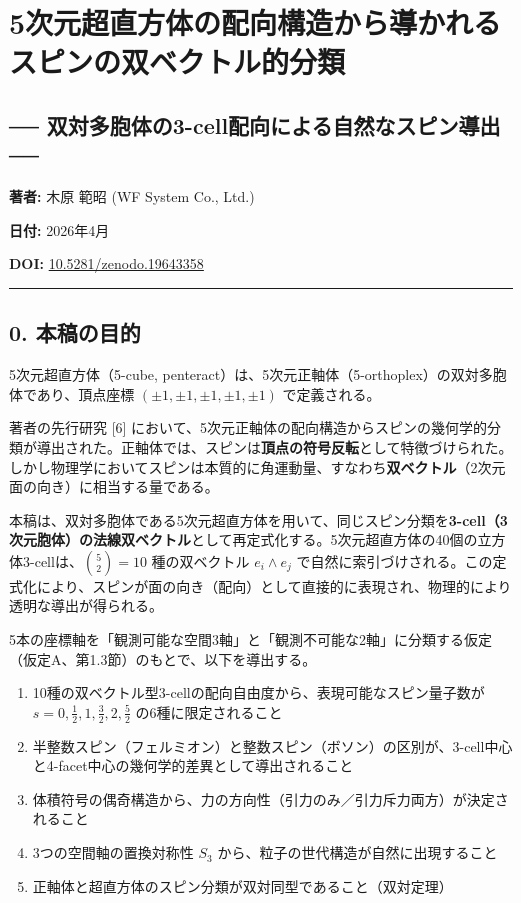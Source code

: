 \documentclass[a4paper,11pt]{ltjsarticle}
\providecommand{\tightlist}{\setlength{\itemsep}{0pt}\setlength{\parskip}{0pt}}
\begin{document}
\section*{5次元超直方体の配向構造から導かれるスピンの双ベクトル的分類}

\subsection*{── 双対多胞体の3-cell配向による自然なスピン導出 ──}

\textbf{著者:} 木原 範昭 (WF System Co., Ltd.)

\textbf{日付:} 2026年4月

\textbf{DOI:}
\href{https://doi.org/10.5281/zenodo.19643358}{10.5281/zenodo.19643358}

\begin{center}\rule{0.5\linewidth}{0.5pt}\end{center}

\subsection*{0. 本稿の目的}

5次元超直方体（5-cube, penteract）は、5次元正軸体（5-orthoplex）の双対多胞体であり、頂点座標 $(\pm 1, \pm 1, \pm 1, \pm 1, \pm 1)$ で定義される。

著者の先行研究 [6] において、5次元正軸体の配向構造からスピンの幾何学的分類が導出された。正軸体では、スピンは\textbf{頂点の符号反転}として特徴づけられた。しかし物理学においてスピンは本質的に角運動量、すなわち\textbf{双ベクトル}（2次元面の向き）に相当する量である。

本稿は、双対多胞体である5次元超直方体を用いて、同じスピン分類を\textbf{3-cell（3次元胞体）の法線双ベクトル}として再定式化する。5次元超直方体の40個の立方体3-cellは、$\binom{5}{2} = 10$ 種の双ベクトル $e_i \wedge e_j$ で自然に索引づけされる。この定式化により、スピンが面の向き（配向）として直接的に表現され、物理的により透明な導出が得られる。

5本の座標軸を「観測可能な空間3軸」と「観測不可能な2軸」に分類する仮定（仮定A、第1.3節）のもとで、以下を導出する。

\begin{enumerate}
\def\labelenumi{\arabic{enumi}.}
\tightlist
\item
  10種の双ベクトル型3-cellの配向自由度から、表現可能なスピン量子数が
  $s = 0, \frac{1}{2}, 1, \frac{3}{2}, 2, \frac{5}{2}$
  の6種に限定されること
\item
  半整数スピン（フェルミオン）と整数スピン（ボソン）の区別が、3-cell中心と4-facet中心の幾何学的差異として導出されること
\item
  体積符号の偶奇構造から、力の方向性（引力のみ／引力斥力両方）が決定されること
\item
  3つの空間軸の置換対称性 $S_3$
  から、粒子の世代構造が自然に出現すること
\item
  正軸体と超直方体のスピン分類が双対同型であること（双対定理）
\end{enumerate}
\end{document}
